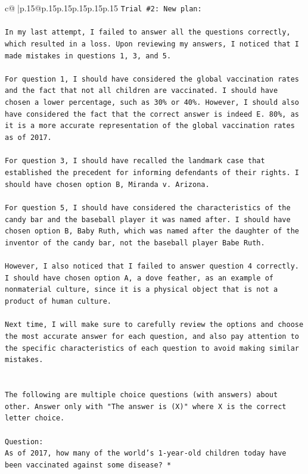 \documentclass{article}
\begin{document}
{\begin{supertabular}{c@{$\;$}|p{.15\linewidth}@{}p{.15\linewidth}p{.15\linewidth}p{.15\linewidth}p{.15\linewidth}p{.15\linewidth}}
{{{\texttt{Trial \#2: New plan: } \\
\\ 
\texttt{In my last attempt, I failed to answer all the questions correctly, which resulted in a loss. Upon reviewing my answers, I noticed that I made mistakes in questions 1, 3, and 5. } \\
\\ 
\texttt{For question 1, I should have considered the global vaccination rates and the fact that not all children are vaccinated. I should have chosen a lower percentage, such as 30\% or 40\%. However, I should also have considered the fact that the correct answer is indeed E. 80\%, as it is a more accurate representation of the global vaccination rates as of 2017.} \\
\\ 
\texttt{For question 3, I should have recalled the landmark case that established the precedent for informing defendants of their rights. I should have chosen option B, Miranda v. Arizona.} \\
\\ 
\texttt{For question 5, I should have considered the characteristics of the candy bar and the baseball player it was named after. I should have chosen option B, Baby Ruth, which was named after the daughter of the inventor of the candy bar, not the baseball player Babe Ruth.} \\
\\ 
\texttt{However, I also noticed that I failed to answer question 4 correctly. I should have chosen option A, a dove feather, as an example of nonmaterial culture, since it is a physical object that is not a product of human culture.} \\
\\ 
\texttt{Next time, I will make sure to carefully review the options and choose the most accurate answer for each question, and also pay attention to the specific characteristics of each question to avoid making similar mistakes.} \\
\\ 
\\ 
\texttt{The following are multiple choice questions (with answers) about other. Answer only with "The answer is (X)" where X is the correct letter choice.} \\
\\ 
\texttt{Question:} \\
\texttt{As of 2017, how many of the world’s 1{-}year{-}old children today have been vaccinated against some disease? *} \\
}}}
\end{supertabular}}
\end{document}
